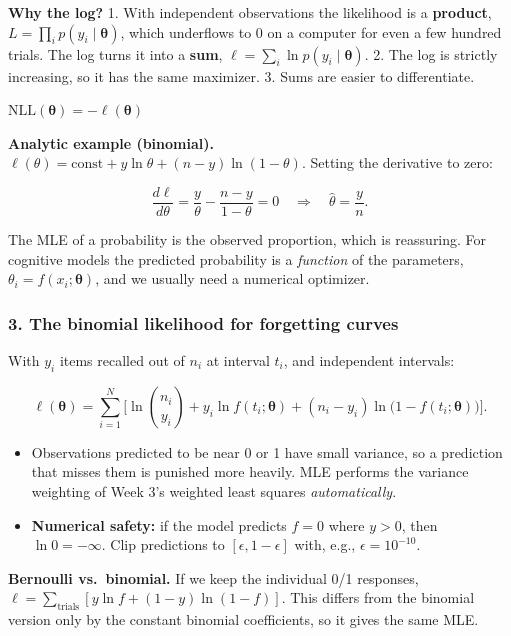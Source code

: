 \textbf{Why the log?} 1. With independent observations the likelihood is
a \textbf{product}, \(L = \prod_i p(y_i\mid\boldsymbol\theta)\), which
underflows to 0 on a computer for even a few hundred trials. The log
turns it into a \textbf{sum},
\(\ell = \sum_i \ln p(y_i\mid\boldsymbol\theta)\). 2. The log is
strictly increasing, so it has the same maximizer. 3. Sums are easier to
differentiate.

\(\mathrm{NLL}(\boldsymbol\theta) = -\ell(\boldsymbol\theta)\)

\textbf{Analytic example (binomial).}
\(\ell(\theta) = \text{const} + y\ln\theta + (n-y)\ln(1-\theta)\).
Setting the derivative to zero:

\[
\frac{d\ell}{d\theta} = \frac{y}{\theta} - \frac{n-y}{1-\theta} = 0 \quad\Rightarrow\quad \hat\theta = \frac{y}{n}.
\]

The MLE of a probability is the observed proportion, which is
reassuring. For cognitive models the predicted probability is a
\emph{function} of the parameters,
\(\theta_i = f(x_i;\boldsymbol\theta)\), and we usually need a numerical
optimizer.

\subsubsection{3. The binomial likelihood for forgetting curves}

With \(y_i\) items recalled out of \(n_i\) at interval \(t_i\), and
independent intervals:

\[
\ell(\boldsymbol\theta) = \sum_{i=1}^{N}\Big[\ln\binom{n_i}{y_i} + y_i \ln f(t_i;\boldsymbol\theta) + (n_i - y_i)\ln\big(1 - f(t_i;\boldsymbol\theta)\big)\Big].
\]

\begin{itemize}
\tightlist
\item
  Observations predicted to be near 0 or 1 have small variance, so a
  prediction that misses them is punished more heavily. MLE performs the
  variance weighting of Week 3's weighted least squares
  \emph{automatically}.
\item
  \textbf{Numerical safety:} if the model predicts \(f = 0\) where
  \(y > 0\), then \(\ln 0 = -\infty\). Clip predictions to
  \([\epsilon, 1-\epsilon]\) with, e.g., \(\epsilon = 10^{-10}\).
\end{itemize}

\textbf{Bernoulli vs.~binomial.} If we keep the individual 0/1
responses, \(\ell = \sum_{\text{trials}} [y\ln f + (1-y)\ln(1-f)]\).
This differs from the binomial version only by the constant binomial
coefficients, so it gives the same MLE.

